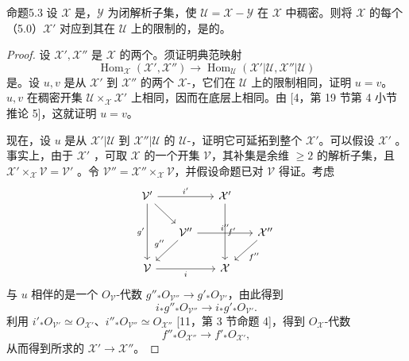 \begin{SGAresult}{命题}{5.3}
设 $\mathcal X$ 是，$\mathcal Y$ 为闭解析子集，使 $\mathcal U=\mathcal X-\mathcal Y$ 在 $\mathcal X$ 中稠密。则将 $\mathcal X$ 的每个（5.0）$\mathcal X'$ 对应到其在 $\mathcal U$ 上的限制的，是的。
\end{SGAresult}
\begin{proof}
设 $\mathcal X',\mathcal X''$ 是 $\mathcal X$ 的两个。须证明典范映射
\[
\operatorname{Hom}_{\mathcal X}(\mathcal X',\mathcal X'')\longrightarrow
\operatorname{Hom}_{\mathcal U}(\mathcal X'|\mathcal U,\mathcal X''|\mathcal U)
\]
是。设 $u,v$ 是从 $\mathcal X'$ 到 $\mathcal X''$ 的两个 $\mathcal X$-，它们在 $\mathcal U$ 上的限制相同，证明 $u=v$。 $u,v$ 在稠密开集 $\mathcal U\times_{\mathcal X}\mathcal X'$ 上相同，因而在底层上相同。由 [4，第 19 节第 4 小节推论 5]，这就证明 $u=v$。

现在，设 $u$ 是从 $\mathcal X'|\mathcal U$ 到 $\mathcal X''|\mathcal U$ 的 $\mathcal U$-，证明它可延拓到整个 $\mathcal X'$。可以假设 $\mathcal X'$ 。事实上，由于 $\mathcal X'$ ，可取 $\mathcal X$ 的一个开集 $\mathcal V$，其补集是余维 $\geq2$ 的解析子集，且 $\mathcal X'\times_{\mathcal X}\mathcal V=\mathcal V'$ 。令 $\mathcal V''=\mathcal X''\times_{\mathcal X}\mathcal V$，并假设命题已对 $\mathcal V$ 得证。考虑
\[
\begin{tikzcd}[column sep=1.5em,row sep=1.8em]
\mathcal V'\arrow[rr,"i'"]\arrow[dd,"g'"']\arrow[dr]&&\mathcal X'\arrow[dd,"f'"]&{}\\
{}&\mathcal V''\arrow[rr,"i''"]\arrow[dl,"g''"']&&\mathcal X''\arrow[dl,"f''"]\\
\mathcal V\arrow[rr,"i"']&&\mathcal X&{}
\end{tikzcd}
\]
与 $u$ 相伴的是一个 $O_{\mathcal V}$-代数 $g''_*O_{\mathcal V''}\to g'_*O_{\mathcal V'}$，由此得到
\[
i_*g''_*O_{\mathcal V''}\longrightarrow i_*g'_*O_{\mathcal V'}.
\]
利用 $i'_*O_{\mathcal V'}\simeq O_{\mathcal X'}$、$i''_*O_{\mathcal V''}\simeq O_{\mathcal X''}$ [11，第 3 节命题 4]，得到 $O_{\mathcal X}$-代数
\[
f''_*O_{\mathcal X''}\longrightarrow f'_*O_{\mathcal X'},
\]
从而得到所求的 $\mathcal X'\to\mathcal X''$。


\end{proof}
